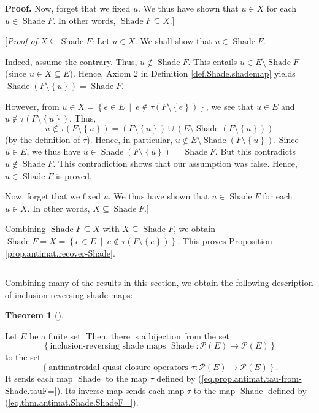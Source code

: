 \documentclass[numbers=enddot,12pt,final,onecolumn]{scrartcl}%
\theoremstyle{definition}
\newtheorem{theo}{Theorem}[section]
\newenvironment{theorem}[1][]
{\begin{theo}[#1]\begin{leftbar}}
{\end{leftbar}\end{theo}}
\newenvironment{proof}[1][Proof]{\noindent\textbf{#1.} }{\ \rule{0.5em}{0.5em}}
\newenvironment{verlong}{}{}
\begin{document}
\begin{verlong}
\begin{proof}
Now, forget that we fixed $u$. We thus have shown that $u\in X$ for each
$u\in\operatorname*{Shade}F$. In other words, $\operatorname*{Shade}F\subseteq
X$.]

[\textit{Proof of }$X\subseteq\operatorname*{Shade}F$\textit{:} Let $u\in X$.
We shall show that $u\in\operatorname*{Shade}F$.

Indeed, assume the contrary. Thus, $u\notin\operatorname*{Shade}F$. This
entails $u\in E\setminus\operatorname*{Shade}F$ (since $u\in X\subseteq E$).
Hence, Axiom 2 in Definition \ref{def.Shade.shademap} yields
$\operatorname*{Shade}\left(  F\setminus\left\{  u\right\}  \right)
=\operatorname*{Shade}F$.

However, from $u\in X=\left\{  e\in E\ \mid\ e\notin\tau\left(  F\setminus
\left\{  e\right\}  \right)  \right\}  $, we see that $u\in E$ and
$u\notin\tau\left(  F\setminus\left\{  u\right\}  \right)  $. Thus,%
\[
u\notin\tau\left(  F\setminus\left\{  u\right\}  \right)  =\left(
F\setminus\left\{  u\right\}  \right)  \cup\left(  E\setminus
\operatorname*{Shade}\left(  F\setminus\left\{  u\right\}  \right)  \right)
\]
(by the definition of $\tau$). Hence, in particular, $u\notin E\setminus
\operatorname*{Shade}\left(  F\setminus\left\{  u\right\}  \right)  $. Since
$u\in E$, we thus have $u\in\operatorname*{Shade}\left(  F\setminus\left\{
u\right\}  \right)  =\operatorname*{Shade}F$. But this contradicts
$u\notin\operatorname*{Shade}F$. This contradiction shows that our assumption
was false. Hence, $u\in\operatorname*{Shade}F$ is proved.

Now, forget that we fixed $u$. We thus have shown that $u\in
\operatorname*{Shade}F$ for each $u\in X$. In other words, $X\subseteq
\operatorname*{Shade}F$.]

Combining $\operatorname*{Shade}F\subseteq X$ with $X\subseteq
\operatorname*{Shade}F$, we obtain $\operatorname*{Shade}F=X=\left\{  e\in
E\ \mid\ e\notin\tau\left(  F\setminus\left\{  e\right\}  \right)  \right\}
$. This proves Proposition \ref{prop.antimat.recover-Shade}.
\end{proof}
\end{verlong}

Combining many of the results in this section, we obtain the following
description of inclusion-reversing shade maps:

\begin{theorem}
\label{thm.antimat.Shade.inc-rev-class}Let $E$ be a finite set. Then, there is
a bijection from the set%
\[
\left\{  \text{inclusion-reversing shade maps }\operatorname*{Shade}%
:\mathcal{P}\left(  E\right)  \rightarrow\mathcal{P}\left(  E\right)
\right\}
\]
to the set%
\[
\left\{  \text{antimatroidal quasi-closure operators }\tau:\mathcal{P}\left(
E\right)  \rightarrow\mathcal{P}\left(  E\right)  \right\}  .
\]
It sends each map $\operatorname*{Shade}$ to the map $\tau$ defined by
(\ref{eq.prop.antimat.tau-from-Shade.tauF=}). Its inverse map sends each map
$\tau$ to the map $\operatorname*{Shade}$ defined by
(\ref{eq.thm.antimat.Shade.ShadeF=}).
\end{theorem}
\end{document}
